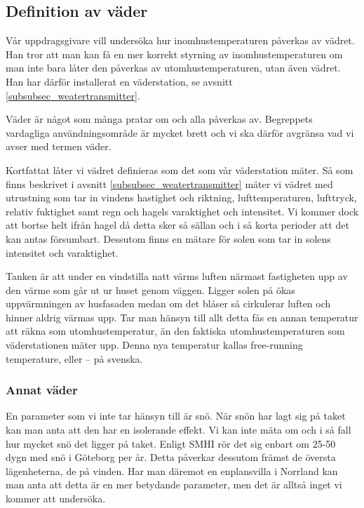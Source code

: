 \subsection{Definition av väder}
\label{subsec_weather}
Vår uppdragsgivare vill undersöka hur inomhustemperaturen påverkas av vädret. Han tror att man kan få en mer korrekt styrning av inomhustemperaturen om man inte bara låter den påverkas av utomhustemperaturen, utan även vädret. Han har därför installerat en väderstation, se avsnitt \ref{subsubsec_weatertransmitter}.

Väder är något som många pratar om och alla påverkas av. Begreppets vardagliga användningsområde är mycket brett och vi ska därför avgränsa vad vi avser med termen väder. 

Kortfattat låter vi vädret definieras som det som vår väderstation mäter. Så som finns beskrivet i avsnitt \ref{subsubsec_weatertransmitter} mäter vi vädret med utrustning som tar in vindens hastighet och riktning, lufttemperaturen, lufttryck, relativ fuktighet samt regn och hagels varaktighet och intensitet. Vi kommer dock att bortse helt ifrån hagel då detta sker så sällan och i så korta perioder att det kan antas försumbart.  Dessutom finns en mätare för solen som tar in solens intensitet och varaktighet. %

Tanken är att under en vindstilla natt värms luften närmast fastigheten upp av den värme som går ut ur huset genom väggen. Ligger solen på ökas uppvärmningen av husfasaden medan om det blåser så cirkulerar luften och hinner aldrig värmas upp. Tar man hänsyn till allt detta fås en annan temperatur att räkna som utomhustemperatur, än den faktiska utomhustemperaturen som väderstationen mäter upp. Denna nya temperatur kallas free-running temperature, eller -- på svenska. %



\subsubsection{Annat väder}
En parameter som vi inte tar hänsyn till är snö. När snön har lagt sig på taket kan man anta att den har en isolerande effekt. Vi kan inte mäta om och i så fall hur mycket snö det ligger på taket. Enligt SMHI %
rör det sig enbart om 25-50 dygn med snö i Göteborg per år. Detta påverkar dessutom främst de översta lägenheterna, de på vinden. Har man däremot en enplansvilla i Norrland kan man anta att detta är en mer betydande parameter, men det är alltså inget vi kommer att undersöka.


